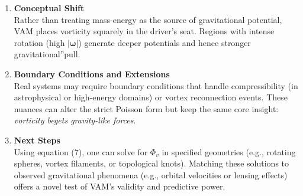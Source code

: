 \begin{enumerate}
    \item \textbf{Conceptual Shift} \\
    Rather than treating mass-energy as the source of gravitational potential, VAM places vorticity squarely in the driver's seat. Regions with intense rotation (high \(|\boldsymbol{\omega}|\)) generate deeper potentials and hence stronger \grqq gravitational\textquotedblright pull.
    \item \textbf{Boundary Conditions and Extensions} \\
    Real systems may require boundary conditions that handle compressibility (in astrophysical or high-energy domains) or vortex reconnection events. These nuances can alter the strict Poisson form but keep the same core insight: \textit{vorticity begets gravity-like forces}.
    \item \textbf{Next Steps} \\
    Using equation (7), one can solve for \(\Phi_v\) in specified geometries (e.g., rotating spheres, vortex filaments, or topological knots). Matching these solutions to observed gravitational phenomena (e.g., orbital velocities or lensing effects) offers a novel test of VAM's validity and predictive power.
\end{enumerate}